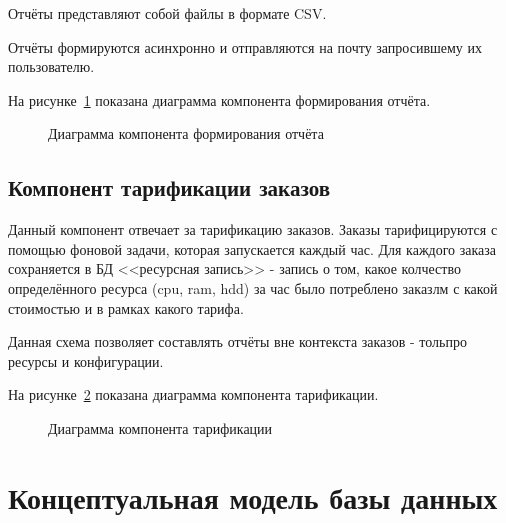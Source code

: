 Отчёты представляют собой файлы в формате CSV.

Отчёты формируются асинхронно и отправляются на почту запросившему их пользователю.

На рисунке~\ref{fig:report_scheme} показана диаграмма компонента формирования отчёта.
\begin{figure}[ht]
  \caption{Диаграмма компонента формирования отчёта}\label{fig:report_scheme}
\end{figure}

\subsection{Компонент тарификации заказов}\label{sec:subs9}
Данный компонент отвечает за тарификацию заказов. Заказы тарифицируются с помощью фоновой задачи, которая запускается каждый час.
Для каждого заказа сохраняется в БД <<ресурсная запись>> - запись о том, какое колчество определённого ресурса (cpu, ram, hdd) за час было потреблено заказлм с какой стоимостью и в рамках какого тарифа.

Данная схема позволяет составлять отчёты вне контекста заказов - тольпро ресурсы и конфигурации.

На рисунке~\ref{fig:tarification_scheme} показана диаграмма компонента тарификации.
\begin{figure}[ht]
  \caption{Диаграмма компонента тарификации}\label{fig:tarification_scheme}
\end{figure}

\section{Концептуальная модель базы данных}\label{sec:ch4/sect3}




